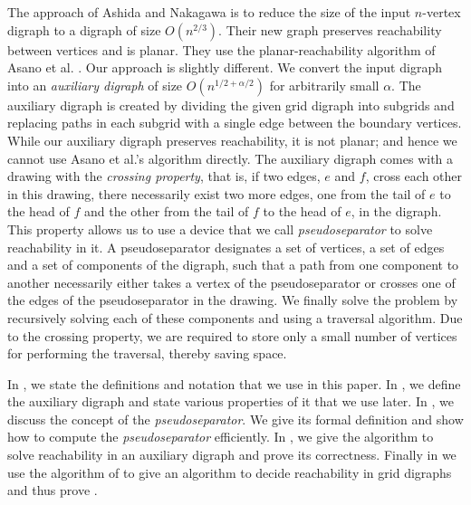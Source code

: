 \documentclass{toc}
\begin{document}
The approach of Ashida and Nakagawa \cite{AshidaNakagawa}
%
%
is   %
to reduce the size of the input $n$-vertex 
digraph %
to a 
digraph %
of size $O(n^{2/3})$. Their new graph %
preserves  %
reachability between vertices and %
is planar.  %
%
They use  %
the planar-reachability algorithm of Asano et al. \cite{Asano}.
%
Our approach is slightly different. We convert the input 
digraph %
into an 
%
\emph{auxiliary digraph} %
 of size $O(n^{1/2 + \alpha/2})$ for arbitrarily small $\alpha$. The auxiliary 
digraph %
is created by dividing the given grid 
digraph %
into subgrids and replacing paths in each subgrid with a single edge between the boundary vertices.  While our auxiliary 
digraph %
preserves reachability, it is not planar; and hence we cannot use Asano et al.'s algorithm directly. The auxiliary 
digraph %
comes with a drawing with
the  %
\emph{crossing property}, that is, if two edges, $e$ and $f$,
%
cross each other in this drawing, there necessarily exist two more edges, one from the tail of $e$ to the head of $f$ and the other from the tail of $f$ to the head of $e$, in the 
digraph. %
This property allows us to use a device that we call \emph{pseudoseparator} to solve reachability in it. A pseudoseparator designates a set of vertices, a set of edges and a set of components of the 
digraph, %
such that a path from one component to %
another   %
necessarily either takes a vertex of the pseudoseparator or crosses one of the edges of the pseudoseparator in the drawing.
We finally solve the problem by recursively solving each of these components and using a traversal algorithm. Due to the crossing property, we are required to store only a small number of vertices for performing the traversal, thereby saving space.

In , we state the definitions and
%
notation  %
that we use in this paper. In , we define the auxiliary 
digraph %
and state various properties of it that we use later. In , we discuss the concept of the \emph{pseudoseparator}. We give its formal definition and show how to compute the \emph{pseudoseparator} efficiently. In , we give the algorithm to solve reachability in an auxiliary 
digraph %
and prove its correctness. Finally in  we use the algorithm of  to give an algorithm to decide reachability in grid 
digraphs %
and thus prove .
\end{document}
